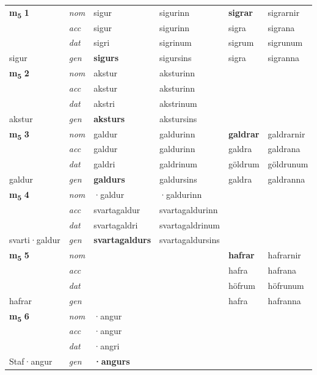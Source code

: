 \begin{longtable}[l]{X>{\footnotesize\itshape}XXXXX}
\multirow{3}{*}{{{\textbf{m{\textsubscript{5}}} \Large{\textbf{1}}}}} & nom & sigur & sigurinn & \textbf{sigrar} & sigrarnir \\*
 & acc & sigur & sigurinn & sigra & sigrana \\*
 & dat & sigri & sigrinum & sigrum & sigrunum \\*
 {\footnotesize{sigur}} & gen & \textbf{sigurs} & sigursins & sigra & sigranna \\
\midrule

\multirow{3}{*}{{{\textbf{m{\textsubscript{5}}} \Large{\textbf{2}}}}} & nom & akstur & aksturinn & \textbf{} &  \\*
 & acc & akstur & aksturinn &  &  \\*
 & dat & akstri & akstrinum &  &  \\*
 {\footnotesize{akstur}} & gen & \textbf{aksturs} & akstursins &  &  \\
\midrule

\multirow{3}{*}{{{\textbf{m{\textsubscript{5}}} \Large{\textbf{3}}}}} & nom & galdur & galdurinn & \textbf{galdrar} & galdrarnir \\*
 & acc & galdur & galdurinn & galdra & galdrana \\*
 & dat & galdri & galdrinum & göldrum & göldrunum \\*
 {\footnotesize{galdur}} & gen & \textbf{galdurs} & galdursins & galdra & galdranna \\
\midrule

\multirow{3}{*}{{{\textbf{m{\textsubscript{5}}} \Large{\textbf{4}}}}} & nom & ·galdur & ·galdurinn & \textbf{} &  \\*
 & acc & svartagaldur & svartagaldurinn &  &  \\*
 & dat & svartagaldri & svartagaldrinum &  &  \\*
 {\footnotesize{svarti\allowbreak ·galdur}} & gen & \textbf{svartagaldurs} & svartagaldursins &  &  \\
\midrule

\multirow{3}{*}{{{\textbf{m{\textsubscript{5}}} \Large{\textbf{5}}}}} & nom &  &  & \textbf{hafrar} & hafrarnir \\*
 & acc &  &  & hafra & hafrana \\*
 & dat &  &  & höfrum & höfrunum \\*
 {\footnotesize{hafrar}} & gen & \textbf{} &  & hafra & hafranna \\
\midrule

\multirow{3}{*}{{{\textbf{m{\textsubscript{5}}} \Large{\textbf{6}}}}} & nom & ·angur &  & \textbf{} &  \\*
 & acc & ·angur &  &  &  \\*
 & dat & ·angri &  &  &  \\*
 {\footnotesize{Staf\allowbreak ·angur}} & gen & \textbf{·angurs} &  &  &  \\
\midrule


\end{longtable}
